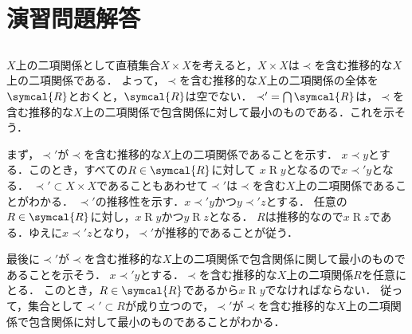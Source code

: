\chapter{演習問題解答} \label{chap:answer}

\section*{}

\subsection*{}

\(X\)上の二項関係として直積集合\(X \times X\)を考えると，\(X \times X\)は\(\prec\)を含む推移的な\(X\)上の二項関係である．
よって，\(\prec\)を含む推移的な\(X\)上の二項関係の全体を\(\symcal{R}\)とおくと，\(\symcal{R}\)は空でない．
\(\mathord{\prec'} = \bigcap \symcal{R}\)は，\(\prec\)を含む推移的な\(X\)上の二項関係で包含関係に対して最小のものである．これを示そう．

まず，\(\prec'\)が\(\prec\)を含む推移的な\(X\)上の二項関係であることを示す．
\(x \prec y\)とする．このとき，すべての\(R \in \symcal{R}\)に対して
\(x \mathrel{R} y\)となるので\(x \prec' y\)となる．
\(\prec' \subset X \times X\)であることもあわせて\(\prec'\)は\(\prec\)を含む\(X\)上の二項関係であることがわかる．
\(\prec'\)の推移性を示す．\(x \prec' y\)かつ\(y \prec' z\)とする．
任意の\(R \in \symcal{R}\)に対し，\(x \mathrel{R} y\)かつ\(y \mathrel{R} z\)となる．
\(R\)は推移的なので\(x \mathrel{R} z\)である．ゆえに\(x \prec' z\)となり，\(\prec'\)が推移的であることが従う．

最後に\(\prec'\)が\(\prec\)を含む推移的な\(X\)上の二項関係で包含関係に関して最小のものであることを示そう．
\(x \prec' y\)とする．\(\prec\)を含む推移的な\(X\)上の二項関係\(R\)を任意にとる．
このとき，\(R \in \symcal{R}\)であるから\(x \mathrel{R} y\)でなければならない．
従って，集合として\(\prec' \subset R\)が成り立つので，\(\prec'\)が\(\prec\)を含む推移的な\(X\)上の二項関係で包含関係に対して最小のものであることがわかる．

\subsection*{}

